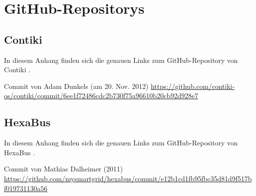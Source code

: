 \chapter{GitHub-Repositorys}

\section{Contiki}

In diesem Anhang finden sich die genauen Links
zum GitHub-Repository von Contiki \autocite{Contiki:GitHub}.

{\raggedright
	Commit von Adam Dunkels (am 20. Nov. 2012)
	\newline
	\url{https://github.com/contiki-os/contiki/commit/6ee1f72486cdc2b730f75a96610b20cb92d928e7}
\par}




\section{HexaBus}

In diesem Anhang finden sich die genauen Links
zum GitHub-Repository von HexaBus \autocite{HexabusProject:GitHub}.

{\raggedright
	Commit von Mathias Dalheimer (2011)
	\newline
	\url{https://github.com/mysmartgrid/hexabus/commit/e12b1cd1fb95fbc35d81d9f517bf019731130a56}
\par}

